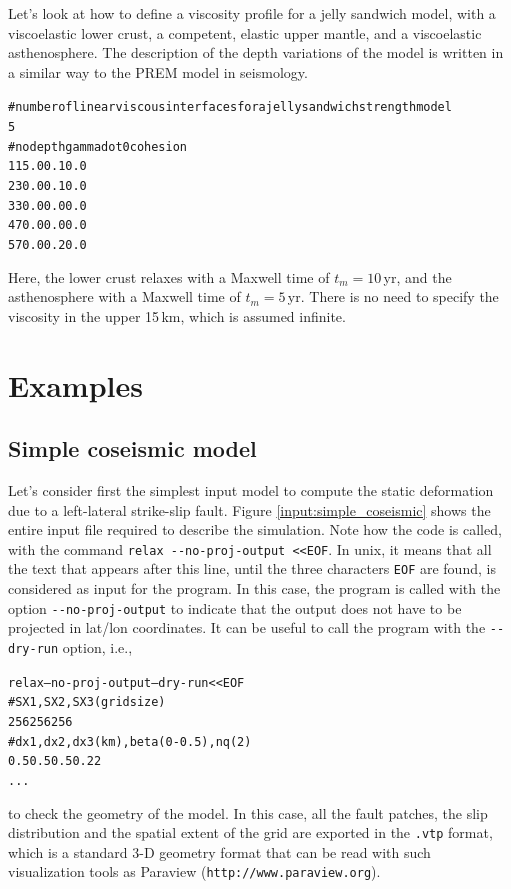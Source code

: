 \documentclass[10pt]{article}
\begin{document}
Let's look at how to define a viscosity profile for a jelly sandwich model, with a viscoelastic lower crust, a competent, elastic upper mantle, and a viscoelastic asthenosphere. The description of the depth variations of the model is written in a similar way to the PREM model in seismology.
\begin{alltt}
# number of linear viscous interfaces for a jelly sandwich strength model
{\color{orange}5}
# no depth gammadot0 cohesion
{\color{orange}   1  15.0       0.1      0.0}
{\color{orange}   2  30.0       0.1      0.0}
{\color{orange}   3  30.0       0.0      0.0}
{\color{orange}   4  70.0       0.0      0.0}
{\color{orange}   5  70.0       0.2      0.0}
\end{alltt}
Here, the lower crust relaxes with a Maxwell time of $t_m=10\,$yr, and the asthenosphere with a Maxwell time of $t_m=5\,$yr. There is no need to specify the viscosity in the upper 15\,km, which is assumed infinite.

\pagebreak
\section{Examples}

\subsection{Simple coseismic model}

Let's consider first the simplest input model to compute the static deformation due to a left-lateral strike-slip fault. Figure \ref{input:simple_coseismic} shows the entire input file required to describe the simulation. Note how the code is called, with the command \verb'relax --no-proj-output <<EOF'. In unix, it means that all the text that appears after this line, until the three characters \verb'EOF' are found, is considered as input for the program. In this case, the program is called with the option \verb'--no-proj-output' to indicate that the output does not have to be projected in lat/lon coordinates. It can be useful to call the program with the \verb'--dry-run' option, i.e.,
\begin{alltt}
relax --no-proj-output {\color{orange}--dry-run} <<EOF
# SX1,SX2,SX3 (grid size)
256 256 256
# dx1,dx2,dx3 (km),beta (0-0.5),nq (2)
0.5 0.5 0.5 0.2 2
...
\end{alltt}
to check the geometry of the model. In this case, all the fault patches, the slip distribution and the spatial extent of the grid are exported in the \verb'.vtp' format, which is a standard 3-D geometry format that can be read with such visualization tools as Paraview (\verb'http://www.paraview.org').
\end{document}
